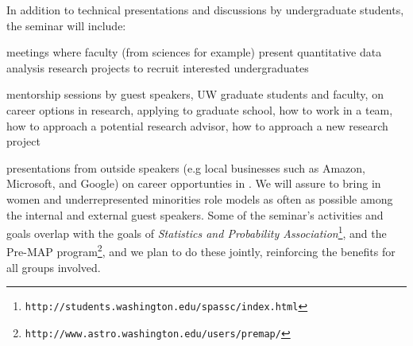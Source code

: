 In addition to technical presentations and discussions by undergraduate
students, the seminar will include:
\bits
\item meetings where faculty (from sciences for example) present quantitative data analysis research projects to recruit interested undergraduates
\item  mentorship sessions by guest speakers, UW graduate students and faculty, on career options in research, applying to graduate school, how to work in a team, how to approach a potential research advisor, how to approach a new research project
\item presentations from outside speakers (e.g local businesses such as Amazon,
  Microsoft, and Google) on career opportunties in \cdse. We will assure to bring in women and underrepresented minorities role models as often as possible among the internal and external guest speakers.
\eits
Some of the seminar's activities and goals overlap with the goals of {\em Statistics and Probability Association}\footnote{{\tt http://students.washington.edu/spassc/index.html}}, and the Pre-MAP program\footnote{\tt http://www.astro.washington.edu/users/premap/}, 
and we plan to do these jointly, reinforcing the  benefits for all groups involved.


